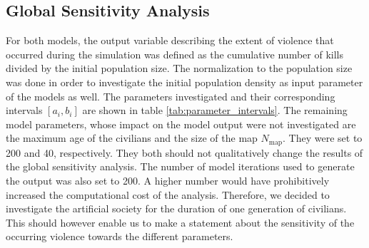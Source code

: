 \documentclass[11pt]{article}
\begin{document}
\subsection{Global Sensitivity Analysis \cite{Saltelli2002,Saltelli2008}}
\label{sec:imp_SA}
For both models, the output variable describing the extent of violence that occurred during the simulation was defined as the cumulative number of kills divided by the initial population size. The normalization to the population size was done in order to investigate the initial population density as input parameter of the models as well. The parameters investigated and their corresponding intervals $[a_i,b_i]$ are shown in table \ref{tab:parameter_intervals}. The remaining model parameters, whose impact on the model output were not investigated are the maximum age of the civilians and the size of the map $N_{\text{map}}$. They were set to 200 and 40, respectively. They both should not qualitatively change the results of the global sensitivity analysis. The number of model iterations used to generate the output was also set to 200. A higher number would have prohibitively increased the computational cost of the analysis. Therefore, we decided to investigate the artificial society for the duration of one generation of civilians. This should however enable us to make a statement about the sensitivity of the occurring violence towards the different parameters.\\
\\
\end{document}
